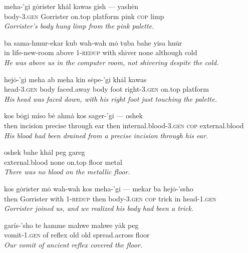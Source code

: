 \documentclass{article}[10pt]
\begin{document}
\begin{exe}


\ex 
\gll meha-'gi g\.{o}rister kh\.{a}l kawas gish --- yash\.{e}n\\
body-3.\textsc{gen} Gorrister on.top platform pink \textsc{cop} limp\\
\trans \emph{Gorrister's body hung limp from the pink palette.}

\ex 
\gll ba sama-hmur-ekar kub wah-wah m\.{o} tuba bahe yisa hn\.{u}r\\
in life-new-room above 1-\textsc{redup} with shiver none although cold\\
\trans \emph{He was above us in the computer room, not shivering despite the cold.}

\ex
\gll hej\.{o}-'gi meha ab meha kin s\.{e}pe-'gi kh\.{a}l kawas\\
head-3.\textsc{gen} body faced.away body foot right-3.\textsc{gen} on.top platform\\
\trans \emph{His head was faced down, with his right foot just touching the palette.}

\ex
\gll kos b\.{o}gi m\'{i}so b\.{e} ahm\.{a} kos sager-'gi --- oshek\\
then incision precise through ear then internal.blood-3.\textsc{gen} \textsc{cop} external.blood\\
\trans \emph{His blood had been drained from a precise incision through his ear.}

\ex
\gll oshek bahe kh\.{a}l peg gareg\\
external.blood none on.top floor metal\\
\trans \emph{There was no blood on the metallic floor.}


\ex
\gll kos g\.{o}rister m\.{o} wah-wah kos meha-'gi --- mekar ba hej\.{o}-'ssho\\
then Gorrister with 1-\textsc{redup} then body-3.\textsc{gen} \textsc{cop} trick in head-1.\textsc{gen}\\
\trans \emph{Gorrister joined us, and we realized his body had been a trick.}

\ex
\gll gar\'{i}s-'sho te hamme mahwe mahwe y\.{a}k peg\\
vomit-1.\textsc{gen} of reflex old old spread.across floor\\
\trans \emph{Our vomit of ancient reflex covered the floor.}



\end{exe}
\end{document}
